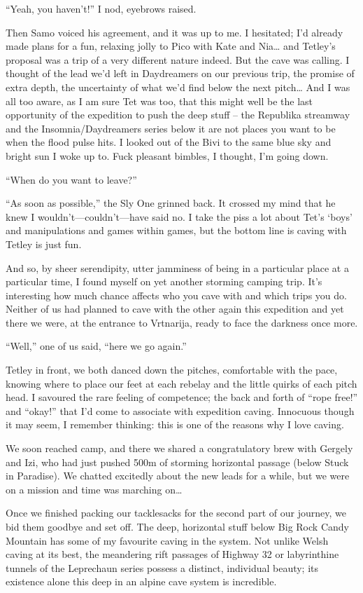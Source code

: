 ``Yeah, you haven't!'' I nod, eyebrows raised.

Then Samo voiced his agreement, and it was up to me. I hesitated; I'd
already made plans for a fun, relaxing jolly to Pico with Kate and
Nia\ldots{} and Tetley's proposal was a trip of a very different nature
indeed. But the cave was calling. I thought of the lead we'd left in
Daydreamers on our previous trip, the promise of extra depth, the
uncertainty of what we'd find below the next pitch\ldots{} And I was all
too aware, as I am sure Tet was too, that this might well be the last
opportunity of the expedition to push the deep stuff -- the Republika
streamway and the Insomnia/Daydreamers series below it are not places
you want to be when the flood pulse hits. I looked out of the Bivi to
the same blue sky and bright sun I woke up to. Fuck pleasant bimbles, I
thought, I'm going down.

``When do you want to leave?''

``As soon as possible,'' the Sly One grinned back. It crossed my mind
that he knew I wouldn't---couldn't---have said no. I take the piss a lot
about Tet's `boys' and manipulations and games within games, but the
bottom line is caving with Tetley is just fun.

And so, by sheer serendipity, utter jamminess of being in a particular
place at a particular time, I found myself on yet another storming
camping trip. It's interesting how much chance affects who you cave with
and which trips you do. Neither of us had planned to cave with the other
again this expedition and yet there we were, at the entrance to
Vrtnarija, ready to face the darkness once more.

``Well,'' one of us said, ``here we go again.''

Tetley in front, we both danced down the pitches, comfortable with the
pace, knowing where to place our feet at each rebelay and the little
quirks of each pitch head. I savoured the rare feeling of competence;
the back and forth of ``rope free!'' and ``okay!'' that I'd come to
associate with expedition caving. Innocuous though it may seem, I
remember thinking: this is one of the reasons why I love caving.

We soon reached camp, and there we shared a congratulatory brew with
Gergely and Izi, who had just pushed 500m of storming horizontal passage
(below Stuck in Paradise). We chatted excitedly about the new leads for
a while, but we were on a mission and time was marching on\ldots{}

Once we finished packing our tacklesacks for the second part of our
journey, we bid them goodbye and set off. The deep, horizontal stuff
below Big Rock Candy Mountain has some of my favourite caving in the
system. Not unlike Welsh caving at its best, the meandering rift
passages of Highway 32 or labyrinthine tunnels of the Leprechaun series
possess a distinct, individual beauty; its existence alone this deep in
an alpine cave system is incredible.


